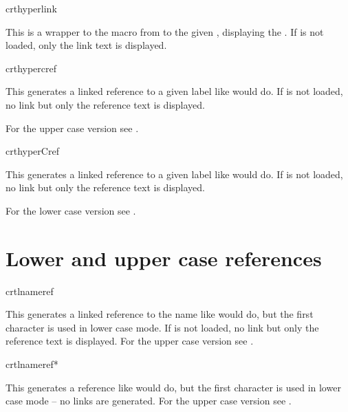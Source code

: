 \documentclass[12pt,a4paper,oneside]{article}
\makeatletter
\newcommand{\chdocextractversion}[1]{%
  \@nameuse{#1}%
}
\makeatother
\begin{document}
\begin{docCommand}[doc new=\chdocextractversion{crossreftoolsversion0.3}]
{crthyperlink}{}

This is a wrapper to the  macro from  to the given , displaying the . If  is not loaded, only the link text is displayed. 
\end{docCommand}

\begin{docCommand}[doc new=\chdocextractversion{crossreftoolsversion0.3}]
{crthypercref}{}

This generates a linked reference to a given label like  would do. If  is not loaded, no link but only the reference text is displayed. 

For the upper case version see . 
\end{docCommand}

\begin{docCommand}[doc new=\chdocextractversion{crossreftoolsversion0.3}]
{crthyperCref}{}

This generates a linked reference to a given label like  would do. If  is not loaded, no link but only the reference text is displayed. 

For the lower case version see . 
\end{docCommand}

\section{Lower and upper case references}

\begin{docCommand}[doc new=\chdocextractversion{crossreftoolsversion0.6}]
{crtlnameref}{}

This generates a linked reference to the name like  would do, but the first character is used in lower case mode. %
If  is not loaded, no link but only the reference text is displayed. 
For the upper case version see . 
\end{docCommand}

\begin{docCommand}[doc new=\chdocextractversion{crossreftoolsversion0.6}]
{crtlnameref*}{}

This generates a reference like  would do, but the first character is used in lower case mode -- no links are generated. 
For the upper case version see . 
\end{docCommand}
\end{document}
